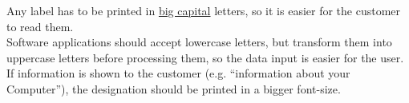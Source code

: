 Any label has to be printed in \underline{big capital} letters, so it is easier
for the customer to read them. \\

Software applications should accept lowercase letters, but transform them into
uppercase letters before processing them, so the data input is easier for the
user. If information is shown to the customer (e.g. ``information about your
Computer''), the designation should be printed in a bigger font-size.
